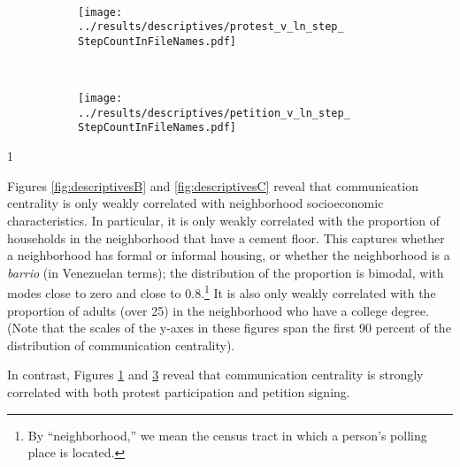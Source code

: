 \documentclass[12pt]{article}
\newcommand{\StepCountInFileNames}{6}
\newcommand{\jop}{0} %
\begin{document}
\begin{figure}[h!]
\begin{subfigure}[t]{0.29\textwidth}
	\end{subfigure} %
        ~  \hspace{0cm}
	\begin{subfigure}[t]{0.29\textwidth}
	\caption{\footnotesize{} }\label{fig:descriptivesE}
	\texttt{[image: ../results/descriptives/protest\_v\_ln\_step\_\\StepCountInFileNames.pdf]} \\[-1.1em]
         \end{subfigure}
        ~  \hspace{0cm}
	\begin{subfigure}[t]{0.29\textwidth}
	\caption{\footnotesize{} }\label{fig:descriptivesF}
	\texttt{[image: ../results/descriptives/petition\_v\_ln\_step\_\\StepCountInFileNames.pdf]} \\[-1.1em]
         \end{subfigure}
\end{figure}

	\if\jop1
	\linespread{2}\selectfont
	\fi



Figures \ref{fig:descriptivesB} and \ref{fig:descriptivesC} reveal that communication centrality is only weakly correlated with neighborhood socioeconomic characteristics. In particular, it is only weakly correlated with the proportion of households in the neighborhood that have a cement floor. This captures whether a neighborhood has formal or informal housing, or whether the neighborhood is a \emph{barrio} (in Venezuelan terms); the distribution of the proportion is bimodal, with modes close to zero and close to 0.8.\footnote{By ``neighborhood,'' we mean the census tract in which a person's polling place is located.} It is also only weakly correlated with the proportion of adults (over 25) in the neighborhood who have a college degree. (Note that the scales of the y-axes in these figures span the first 90 percent of the distribution of communication centrality).

In contrast, Figures \ref{fig:descriptivesE} and \ref{fig:descriptivesF} reveal that communication centrality is strongly correlated with both protest participation and petition signing.
\end{document}
